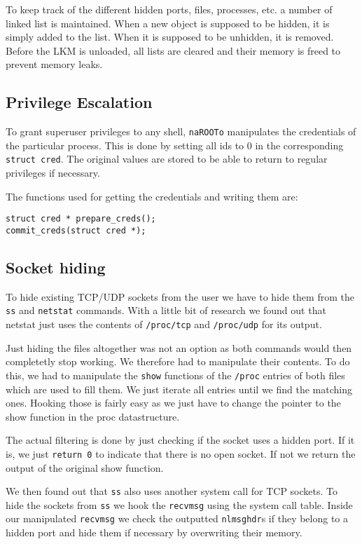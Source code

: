 \documentclass[10pt, letterpaper]{scrartcl}
\begin{document}
To keep track of the different hidden ports, files, processes, etc. a number of linked list is maintained.
When a new object is supposed to be hidden, it is simply added to the list.
When it is supposed to be unhidden, it is removed.
Before the LKM is unloaded, all lists are cleared and their memory is freed to prevent memory leaks.

\subsection{Privilege Escalation}
To grant superuser privileges to any shell, \texttt{naROOTo} manipulates the credentials of the particular process.
This is done by setting all ids to 0 in the corresponding \texttt{struct cred}.
The original values are stored to be able to return to regular privileges if necessary.

The functions used for getting the credentials and writing them are:

\begin{verbatim}
struct cred * prepare_creds();
commit_creds(struct cred *);
\end{verbatim}

\subsection{Socket hiding}
To hide existing TCP/UDP sockets from the user we have to hide them from the \texttt{ss} and \texttt{netstat} commands.
With a little bit of research we found out that netstat just uses the contents of \texttt{/proc/tcp} and \texttt{/proc/udp} for its output.

Just hiding the files altogether was not an option as both commands would then completetly stop working.
We therefore had to manipulate their contents. 
To do this, we had to manipulate the \texttt{show} functions of the \texttt{/proc} entries of both files which are used to fill them. 
We just iterate all entries until we find the matching ones.
Hooking those is fairly easy as we just have to change the pointer to the show function in the proc datastructure. 

The actual filtering is done by just checking if the socket uses a hidden port.
If it is, we just \texttt{return 0} to indicate that there is no open socket.
If not we return the output of the original show function.

We then found out that \texttt{ss} also uses another system call for TCP sockets.
To hide the sockets from \texttt{ss} we hook the \texttt{recvmsg} using the system call table. 
Inside our manipulated \texttt{recvmsg} we check the outputted \texttt{nlmsghdr}s if they belong to a hidden port and hide them if necessary by overwriting their memory.
\end{document}
